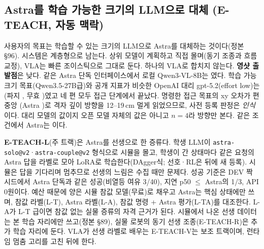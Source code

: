 \subsection{Astra를 학습 가능한 크기의 LLM으로 대체 (E-TEACH, 자동 맥락)}
\label{sec:plan_teach}
사용자의 목표는 학습할 수 있는 크기의 LLM으로 Astra를 대체하는 것이다(정본 §96). 시스템은 계층형으로 남는다. 상위 모델이 계획하고 직접 몰며(동기 조종과 흐름 교정), VLA는 빠른 조이스틱으로 그대로 둔다. 하나의 VLA로 합치지 않는다. \textbf{영샷 출발점}은 낮다. 같은 Astra 단독 인터페이스에서 로컬 Qwen3-VL-8B는 였다. 학습 가능 크기 목표(Qwen3.5-27B급)와 공개 지표가 비슷한 OpenAI 대리 gpt-5.2(effort low)는 (파지 , 무효 )였고 네 편 모두 접근 단계에서 끝났다. 명령한 접근 목표의 xy 오차가 편 중앙 (Astra )로 격자 깊이 방향을 12--19\,cm 멀게 읽었으므로, 사전 등록 판정은 \emph{인식}이다. 대리 모델의 값이지 오픈 모델 자체의 값은 아니고 $n=4$라 방향만 본다. 같은 조건에서 Astra는 이다.

\textbf{E-TEACH-L}(주 트랙)은 Astra를 선생으로 한 증류다. 학생 LLM이 \texttt{astra-solo@v2}·\texttt{astra-couple@v2} 형식으로 시뮬을 몰고, 학생이 간 상태마다 같은 요청의 Astra 답을 라벨로 모아 LoRA로 학습한다(DAgger식; 선호·RL은 뒤에 새 등록). 시뮬은 답을 기다리며 멈추므로 선생의 느림은 수집 때만 문제다. 성공 기준은 DEV 짝 시드에서 Astra 단독과 같은 성공(비열등 여유 3/40), 지연 p50 $\le$ Astra의 1/3, API 0원이다. 예산 때문에 양은 시뮬 참값 모델(무료)로 채우고 Astra는 핵심 상태에만 쓰며, 참값 라벨(L-T), Astra 라벨(L-A), 참값 명령 + Astra 평가(L-TA)를 대조한다. L-A가 L-T 급이면 참값 없는 실물 증류의 자격 근거가 된다. 시뮬에서 나온 선생 데이터는 본 학습 자리에만 쓰고(정본 §89), 실물 로봇의 동기 선생 조종(E-TEACH-R)은 추가 학습 자리에 둔다. VLA가 선생 라벨로 배우는 E-TEACH-V는 보조 트랙이며, 런타임 멈춤 고리를 고친 뒤에 한다.

